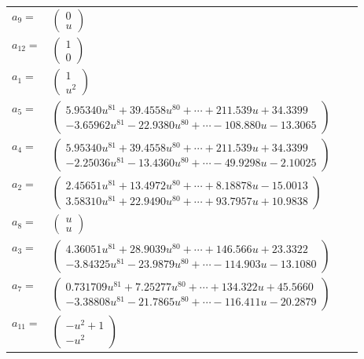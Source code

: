 \documentclass[1p]{elsarticle_modified}
\theoremstyle{definition}
\begin{document}
\begin{tabular}{m{7pt} m{180pt} m{7pt} m{180pt} }
\flushright $a_{9}=$&$\begin{pmatrix}0\\u\end{pmatrix}$ \\
\flushright $a_{12}=$&$\begin{pmatrix}1\\0\end{pmatrix}$ \\
\flushright $a_{1}=$&$\begin{pmatrix}1\\u^2\end{pmatrix}$ \\
\flushright $a_{5}=$&$\begin{pmatrix}5.95340 u^{81}+39.4558 u^{80}+\cdots+211.539 u+34.3399\\-3.65962 u^{81}-22.9380 u^{80}+\cdots-108.880 u-13.3065\end{pmatrix}$ \\
\flushright $a_{4}=$&$\begin{pmatrix}5.95340 u^{81}+39.4558 u^{80}+\cdots+211.539 u+34.3399\\-2.25036 u^{81}-13.4360 u^{80}+\cdots-49.9298 u-2.10025\end{pmatrix}$ \\
\flushright $a_{2}=$&$\begin{pmatrix}2.45651 u^{81}+13.4972 u^{80}+\cdots+8.18878 u-15.0013\\3.58310 u^{81}+22.9490 u^{80}+\cdots+93.7957 u+10.9838\end{pmatrix}$ \\
\flushright $a_{8}=$&$\begin{pmatrix}u\\u\end{pmatrix}$ \\
\flushright $a_{3}=$&$\begin{pmatrix}4.36051 u^{81}+28.9039 u^{80}+\cdots+146.566 u+23.3322\\-3.84325 u^{81}-23.9879 u^{80}+\cdots-114.903 u-13.1080\end{pmatrix}$ \\
\flushright $a_{7}=$&$\begin{pmatrix}0.731709 u^{81}+7.25277 u^{80}+\cdots+134.322 u+45.5660\\-3.38808 u^{81}-21.7865 u^{80}+\cdots-116.411 u-20.2879\end{pmatrix}$ \\
\flushright $a_{11}=$&$\begin{pmatrix}- u^2+1\\- u^2\end{pmatrix}$ \\

\end{tabular}
\end{document}
